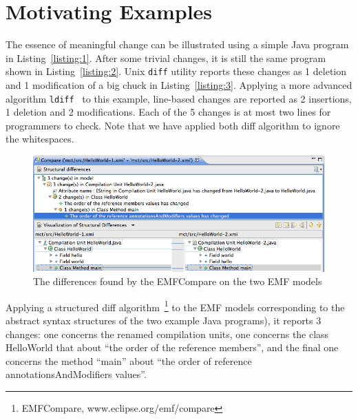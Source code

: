 \documentclass[10pt, conference, compsocconf]{IEEEtran}
\begin{document}
\section{Motivating Examples}\label{sec:background}
The essence of meaningful change can be illustrated using a simple Java program in Listing~\ref{listing:1}.
After some trivial changes, it is still the same program shown in Listing~\ref{listing:2}.
Unix {\tt diff} utility reports these changes as 1 deletion and 1 modification of a big chuck in Listing~\ref{listing:3}. Applying a more advanced algorithm {\tt ldiff}~\cite{canfora09software} to this example, line-based changes are reported as 2 insertions, 1 deletion and 2 modifications. Each of the 5 changes is at most two lines for programmers to check. Note that we have applied both diff algorithm to ignore the whitespaces. 






\begin{figure}\centering
\includegraphics[width=\columnwidth]{code/emfcompare.png}
\caption{The differences found by the EMFCompare on the two EMF models}\label{fig:1}
\end{figure}
Applying a structured diff algorithm~\footnote{EMFCompare, www.eclipse.org/emf/compare} to the EMF models corresponding to the abstract syntax structures of the two example Java programs\cite{DBLP:conf/sle/HeidenreichJSW09}), it reports 3 changes: one concerns the renamed compilation units, one concerns the class HelloWorld that about ``the order of the reference members'', and the final one concerns the method ``main'' about ``the order of reference annotationsAndModifiers values''. 
\end{document}
